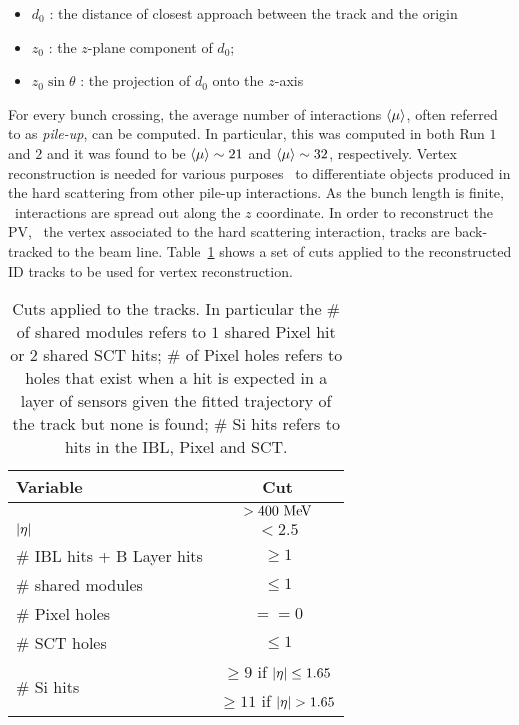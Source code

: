 			\begin{itemize}
				\item $d_0$ : the distance of closest approach between the track and the origin
				\item $z_0$ : the $z$-plane component of $d_0$;
				\item $z_0 \sin \theta$ : the projection of $d_0$ onto the $z$-axis
			\end{itemize}

			For every bunch crossing, the average number of interactions $\langle\mu\rangle$, often referred to as \emph{pile-up}, can be computed. In particular, this was computed in both Run $1$ and $2$ and it was found to be $\langle\mu\rangle \sim 21$ and $\langle\mu\rangle \sim 32$, respectively. Vertex reconstruction is needed for various purposes \eg\ to differentiate objects produced in the hard scattering from other pile-up interactions. As the bunch length is finite, \pp\ interactions are spread out along the $z$ coordinate. In order to reconstruct the \ac{PV}, \ie\ the vertex associated to the hard scattering interaction, tracks are back-tracked to the beam line. Table~\ref{tab:tracksCuts} shows a set of cuts applied to the reconstructed \ac{ID} tracks to be used for vertex reconstruction.

			\begin{table}[!htb]\centering\caption{Cuts applied to the tracks. In particular the \# of shared modules refers to $1$ shared Pixel hit or $2$ shared \ac{SCT} hits; \# of Pixel holes refers to holes that exist when a hit is expected in a layer of sensors given the fitted trajectory of the track but none is found; \# Si hits refers to hits in the IBL, Pixel and SCT.}
			\renewcommand{\arraystretch}{1.3}
				\begin{tabular}{lc}
					\toprule
					\textbf{Variable} & \textbf{Cut} \\
					\toprule
					\pt & $> 400 \MeV$ \\%
					$|\eta|$ & $< 2.5$ \\ %
					\# \acs{IBL} hits + B Layer hits & $\geq 1$ \\ 
					\# shared modules& $\leq 1$ \\
					\# Pixel holes & $== 0$ \\
					\# \ac{SCT} holes & $\leq 1$ \\ \midrule
					\multirow{2}{*}{\# Si hits} & $\geq 9$ if $|\eta| \leq 1.65$ \\
									&  $\geq 11$ if $|\eta| > 1.65$ \\ 
					\bottomrule
				\end{tabular}

			\label{tab:tracksCuts} 
			\end{table}

